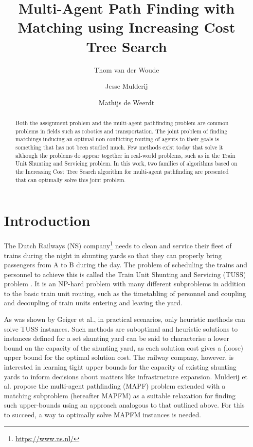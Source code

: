 \documentclass[english]{article}
\begin{document}
	
	\title{Multi-Agent Path Finding with Matching using Increasing Cost Tree Search}
	
	\author{Thom van der Woude\and Jesse Mulderij\and Mathijs de Weerdt}
	\date{}
	
	\maketitle
	
	\begin{abstract}
		Both the assignment problem and the multi-agent pathfinding problem are common problems in fields such as robotics and transportation. The joint problem of finding matchings inducing an optimal non-conflicting routing of agents to their goals is something that has not been studied much. Few methods exist today that solve it although the problems do appear together in real-world problems, such as in the Train Unit Shunting and Servicing problem. In this work, two families of algorithms based on the Increasing Cost Tree Search algorithm for multi-agent pathfinding are presented that can optimally solve this joint problem.
	\end{abstract}
	
	\section{Introduction}
	The Dutch Railways (NS) company\footnote{\url{https://www.ns.nl/}} needs to clean and service their fleet of trains during the night in shunting yards so that they can properly bring passengers from A to B during the day. 
	The problem of scheduling the trains and personnel to achieve this is called the Train Unit Shunting and Servicing (TUSS) problem \cite{mulderij2020}. 
	It is an NP-hard problem with many different subproblems in addition to the basic train unit routing, such as the timetabling of personnel and coupling and decoupling of train units entering and leaving the yard. %
	
	As was shown by Geiger et al.\cite{geiger2018}, in practical scenarios, only heuristic methods can solve TUSS instances. 
	Such methods are suboptimal and heuristic solutions to instances defined for a set shunting yard can be said to characterise a lower bound on the capacity of the shunting yard, as each solution cost gives a (loose) upper bound for the optimal solution cost. 
	The railway company, however, is interested in learning tight upper bounds for the capacity of existing shunting yards to inform decisions about matters like infrastructure expansion. 
	Mulderij et al. \cite{mulderij2020} propose the multi-agent pathfinding (MAPF) problem \cite{stern2019} extended with a matching subproblem (hereafter MAPFM) as a suitable relaxation for finding such upper-bounds using an approach analogous to that outlined above.
	For this to succeed, a way to optimally solve MAPFM instances is needed.
	
\end{document}
